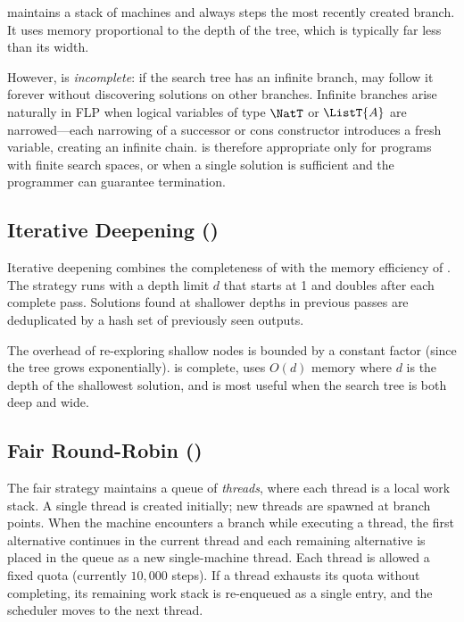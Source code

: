 \DFS{} maintains a stack of machines and always steps the most recently created
branch. It uses memory proportional to the depth of the tree, which is typically
far less than its width.

However, \DFS{} is \emph{incomplete}: if the search tree has an infinite branch,
\DFS{} may follow it forever without discovering solutions on other branches.
Infinite branches arise naturally in FLP when logical variables of type $\NatT$
or $\ListT{A}$ are narrowed---each narrowing of a successor or cons constructor
introduces a fresh variable, creating an infinite chain. \DFS{} is therefore
appropriate only for programs with finite search spaces, or when a single
solution is sufficient and the programmer can guarantee termination.

\subsection{Iterative Deepening (\IDDFS{})}

Iterative deepening combines the completeness of \BFS{} with the memory
efficiency of \DFS{}. The strategy runs \DFS{} with a depth limit $d$ that
starts at 1 and doubles after each complete pass. Solutions found at shallower
depths in previous passes are deduplicated by a hash set of previously seen
outputs.

The overhead of re-exploring shallow nodes is bounded by a constant factor
(since the tree grows exponentially). \IDDFS{} is complete, uses $O(d)$ memory
where $d$ is the depth of the shallowest solution, and is most useful when the
search tree is both deep and wide.

\subsection{Fair Round-Robin (\Fair{})}

The fair strategy maintains a queue of \emph{threads}, where each thread is a
local \DFS{} work stack. A single thread is created initially; new threads are
spawned at branch points. When the machine encounters a branch while executing a
thread, the first alternative continues in the current thread and each remaining
alternative is placed in the queue as a new single-machine thread. Each thread
is allowed a fixed quota (currently $10{,}000$ steps). If a thread exhausts its
quota without completing, its remaining work stack is re-enqueued as a single
entry, and the scheduler moves to the next thread.

